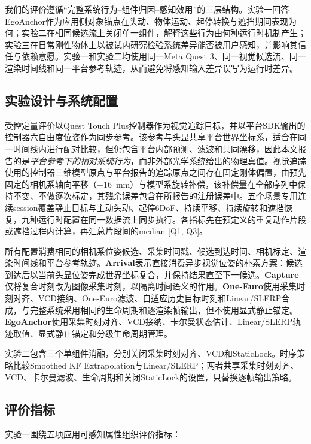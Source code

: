 \documentclass[review]{vgtc}
\begin{document}
我们的评价遵循“完整系统行为--组件归因--感知效用”的三层结构。实验一回答EgoAnchor作为应用侧对象锚点在头动、物体运动、起停转换与遮挡期间表现为何；实验二在相同候选流上关闭单一组件，解释这些行为由何种运行时机制产生；实验三在日常刚性物体上以被试内研究检验系统差异能否被用户感知，并影响其信任与依赖意愿。实验一和实验二均使用同一Meta Quest 3、同一视觉候选流、同一渲染时间线和同一平台参考轨迹，从而避免将感知输入差异误写为运行时差异。

\subsection{实验设计与系统配置}

受控定量评价以Quest Touch Plus控制器作为视觉追踪目标，并以平台SDK输出的控制器六自由度位姿作为同步参考。该参考与头显共享平台世界坐标系，适合在同一时间线内进行配对比较，但仍包含平台内部预测、滤波和共同漂移，因此本文报告的是\emph{平台参考下的相对系统行为}，而非外部光学系统给出的物理真值。视觉追踪使用的控制器三维模型原点与平台报告的追踪原点之间存在固定刚体偏置，由预先固定的相机系轴向平移（$-16$~mm）与模型系旋转补偿，该补偿量在全部序列中保持不变、不做逐次标定，其残余误差包含在所报告的注册误差中。五个场景专用连续session覆盖静止目标与主动头动、起停6DoF、持续平移、持续旋转和遮挡恢复，九种运行时配置在同一数据流上同步执行。各指标先在预定义的重复动作片段或遮挡过程内计算，再汇总片段间的median [Q1, Q3]。

所有配置消费相同的相机系位姿候选、采集时间戳、候选到达时间、相机标定、渲染时间线和平台参考轨迹。\textbf{Arrival}表示直接消费异步视觉位姿的朴素方案：候选到达后以当前头显位姿完成世界坐标复合，并保持结果直至下一候选。\textbf{Capture}仅将复合时刻改为图像采集时刻，以隔离时间语义的作用。\textbf{One-Euro}使用采集时刻对齐、VCD接纳、One-Euro滤波、自适应历史目标时刻和Linear/SLERP合成，与完整系统采用相同的生命周期和逐渲染帧输出，但不使用显式静止锚定。\textbf{EgoAnchor}使用采集时刻对齐、VCD接纳、卡尔曼状态估计、Linear/SLERP轨迹取值、显式静止锚定和分级生命周期管理。

实验二包含三个单组件消融，分别关闭采集时刻对齐、VCD和StaticLock。时序策略比较Smoothed KF Extrapolation与Linear/SLERP；两者共享采集时刻对齐、VCD、卡尔曼滤波、生命周期和关闭StaticLock的设置，只替换逐帧输出策略。

\subsection{评价指标}

实验一围绕五项应用可感知属性组织评价指标：
\end{document}

